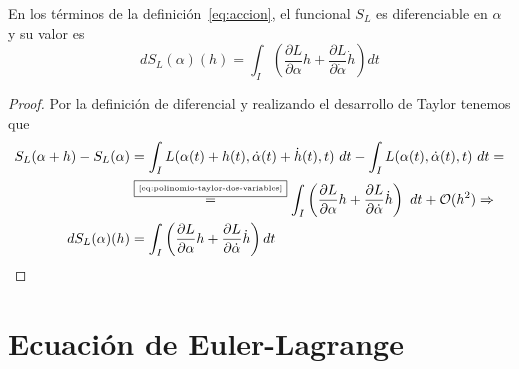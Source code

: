 \begin{proposition}
	En los términos de la definición~\eqref{eq:accion}, el funcional $S_L$ es diferenciable en $\alpha$ y su valor es
	\begin{equation}
		\label{eq:accion_diferencial}
		dS_L(\alpha)(h)=\int_{I}\left( \frac{\partial L}{\partial\alpha}h+\frac{\partial L}{\partial\dot{\alpha}}\dot{h}\right) dt
	\end{equation}
\end{proposition}
\begin{proof}
	Por la definición de diferencial y realizando el desarrollo de Taylor tenemos que
	\begin{equation*}
		\begin{split}
			S_L(\alpha + h) -  S_L(\alpha)& = \int_{I}L(\alpha(t)+h(t), \dot{\alpha}(t)+\dot{h}(t), t)\ dt - \int_{I}L(\alpha(t), \dot{\alpha}(t), t)\ dt =\\
			&\overset{\fbox{\tiny \ref{eq:polinomio-taylor-dos-variables}}}{=}\int_{I}\left( \frac{\partial L}{\partial\alpha}h+\frac{\partial L}{\partial\dot{\alpha}}\dot{h}\right)\ dt+\mathcal{O}(h^2)\Rightarrow\\
			dS_L(\alpha)(h) &=\int_{I}\left( \frac{\partial L}{\partial\alpha}h+\frac{\partial L}{\partial\dot{\alpha}}\dot{h}\right) dt
		\end{split}
	\end{equation*}
\end{proof}

\section{Ecuación de Euler-Lagrange}

